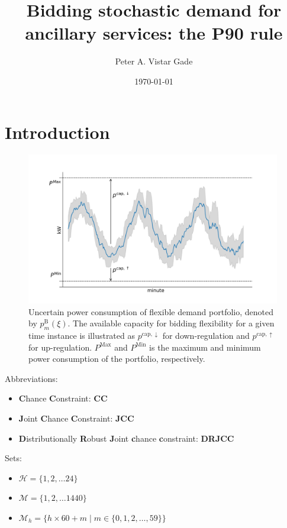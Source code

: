 \documentclass{report}
\title{Bidding stochastic demand for ancillary services: the P90 rule}
\author{Peter A. Vistar Gade}
\date{\today}
\begin{document}
\maketitle


\section*{Introduction}


\begin{figure}[!t]
    \centering
    \includegraphics[width=0.99\textwidth]{figures/power_high_res_plot.png}
    \caption{Uncertain power consumption of flexible demand portfolio, denoted by $p_{m}^{\text{B}}(\xi)$. The available capacity for bidding flexibility for a given time instance is illustrated as $p^{\text{cap},\downarrow}$ for down-regulation and $p^{\text{cap},\uparrow}$ for up-regulation. $P^{\text{Max}}$ and $P^{\text{Min}}$ is the  maximum and minimum power consumption of the portfolio, respectively.}
    \label{fig:power}
\end{figure}

\noindent Abbreviations:

\begin{itemize}
    \item \textbf{C}hance \textbf{C}onstraint: \textbf{CC}
    \item \textbf{J}oint \textbf{C}hance \textbf{C}onstraint: \textbf{JCC}
    \item \textbf{D}istributionally \textbf{R}obust \textbf{J}oint \textbf{c}hance \textbf{c}onstraint: \textbf{DRJCC}
\end{itemize}

\noindent Sets:

\begin{itemize}
    \item $\mathcal{H} = \{1, 2,  \ldots 24\}$
    \item $\mathcal{M} = \{1, 2,  \ldots 1440\}$
    \item $ \mathcal{M}_{h} = \{h \times 60 + m \mid m \in \{0, 1, 2, \ldots, 59\}\}$

\end{itemize}
\end{document}
